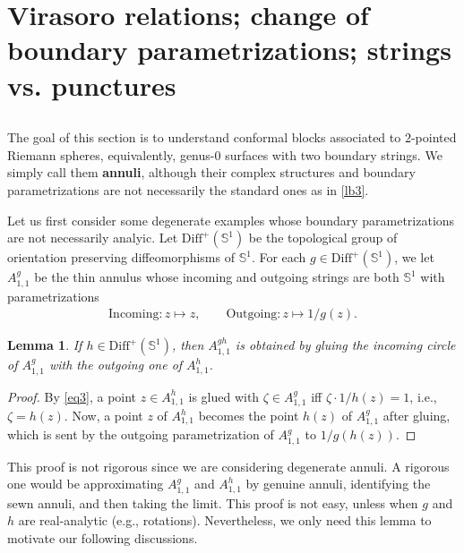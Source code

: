 \documentclass[12pt,a4paper,notitlepage]{article}
\theoremstyle{definition}
\theoremstyle{plain}
\newtheorem{lm}[df]{Lemma}
\newcommand{\Diffp}{\mathrm{Diff}^+}
\newcommand{\Sbb}{{\mathbb S}}
\numberwithin{equation}{section}
\begin{document}
\section{Virasoro relations; change of boundary  parametrizations; strings vs. punctures}\label{lb41}




\subsection{}\label{lb9}
The goal of this section is to understand conformal blocks associated to $2$-pointed Riemann spheres, equivalently, genus-$0$ surfaces with two boundary strings. We simply call them \textbf{annuli}, although their complex structures and boundary parametrizations are not necessarily the standard ones as in \ref{lb3}.



Let us first consider some degenerate examples whose boundary parametrizations are not necessarily analyic. Let $\Diffp(\Sbb^1)$ \index{Diff@$\Diffp(\Sbb^1)$} be the topological group of orientation preserving diffeomorphisms of $\Sbb^1$. For each $g\in\Diffp(\Sbb^1)$, we let $A_{1,1}^g$ be the thin annulus whose incoming and outgoing strings are both $\Sbb^1$ with parametrizations
\begin{gather*}
\text{Incoming}: z\mapsto z,\qquad \text{Outgoing}: z\mapsto 1/g(z).	
\end{gather*}

\begin{lm}
If $h\in\Diffp(\Sbb^1)$, then $A_{1,1}^{gh}$ is obtained by gluing the incoming circle of  $A_{1,1}^g$ with the outgoing one of $A_{1,1}^h$.
\end{lm}


\begin{proof}
By \eqref{eq3}, a point $z\in A_{1,1}^h$ is glued with $\zeta\in A_{1,1}^g$ iff $\zeta\cdot 1/h(z)=1$, i.e., $\zeta=h(z)$. Now, a point $z$ of $A_{1,1}^h$ becomes the point $h(z)$ of $A_{1,1}^g$ after gluing, which is sent by the outgoing parametrization of $A_{1,1}^g$ to $1/g(h(z))$.
\end{proof}

This proof is not rigorous since we are considering degenerate annuli. A rigorous one would be approximating $A_{1,1}^g$ and $A_{1,1}^h$ by genuine annuli, identifying the sewn annuli, and then taking the limit. This proof is not easy, unless when $g$ and $h$ are real-analytic (e.g., rotations). Nevertheless, we only need this lemma to motivate our following discussions.  
\end{document}
